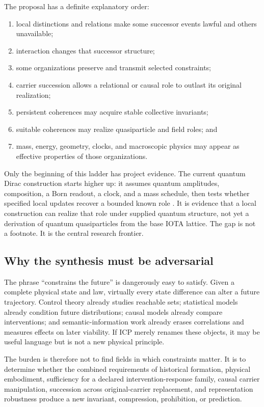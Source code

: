 The proposal has a definite explanatory order:
\begin{enumerate}
  \item local distinctions and relations make some successor events lawful and
  others unavailable;
  \item interaction changes that successor structure;
  \item some organizations preserve and transmit selected constraints;
  \item carrier succession allows a relational or causal role to outlast its
  original realization;
  \item persistent coherences may acquire stable collective invariants;
  \item suitable coherences may realize quasiparticle and field roles; and
  \item mass, energy, geometry, clocks, and macroscopic physics may appear as
  effective properties of those organizations.
\end{enumerate}

Only the beginning of this ladder has project evidence. The current quantum
Dirac construction starts higher up: it assumes quantum amplitudes,
composition, a Born readout, a clock, and a mass schedule, then tests whether
specified local updates recover a bounded known role
\citep{Clark2026DiracRole}. It is evidence that a local construction can realize
that role under supplied quantum structure, not yet a derivation of quantum
quasiparticles from the base IOTA lattice. The gap is not a footnote. It is the
central research frontier.

\subsection{Why the synthesis must be adversarial}

The phrase ``constrains the future'' is dangerously easy to satisfy. Given a
complete physical state and law, virtually every state difference can alter a
future trajectory. Control theory already studies reachable sets; statistical
models already condition future distributions; causal models already compare
interventions; and semantic-information work already erases correlations and
measures effects on later viability. If ICP merely renames these objects, it may
be useful language but is not a new physical principle.

The burden is therefore not to find fields in which constraints matter. It is
to determine whether the combined requirements of historical formation,
physical embodiment, sufficiency for a declared intervention-response family,
causal carrier manipulation, succession across original-carrier replacement,
and representation robustness produce a new invariant, compression,
prohibition, or prediction.
